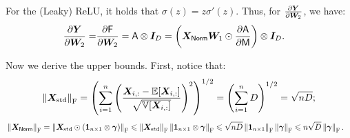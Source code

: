 For the (Leaky) ReLU, it holds that $\sigma(z)=z\sigma'(z)$. Thus, for $\frac{\partial \bY}{\partial\bW_2}$, we have: 
\begin{align*}
    \frac{\partial \bY}{\partial\bW_{2}}=&\frac{\partial\FFFN}{\partial\bW_{2}}=\ASA\otimes\bI_D=\left(\bX_{\LN}\bW_1\odot\frac{\partial\ASA}{\partial\MSA}\right)\otimes\bI_D.
\end{align*}

Now we derive the upper bounds. First, notice that:
\begin{align*}
    \norm{\bX_{\rm std}}_\rF=\left(\sum_{i=1}^n \left(\frac{\bX_{i,:}-\bbE[\bX_{i,:}]}{\sqrt{\bbV[\bX_{i,:}]}}\right)^2\right)^{1/2}=\left(\sum_{i=1}^n D\right)^{1/2}=\sqrt{nD};
\end{align*}
\begin{align*}
    &\norm{\bX_\LN}_\rF
    =\norm{\bX_{\rm std}\odot(\bone_{n\times 1}\otimes\bgamma)}_\rF
    \leq\norm{\bX_{\rm std}}_\rF\norm{\bone_{n\times 1}\otimes\bgamma}_\rF\leq\sqrt{nD}\norm{\bone_{n\times 1}}_\rF\norm{\bgamma}_\rF\leq n\sqrt{D}\norm{\bgamma}_\rF.
\end{align*}

